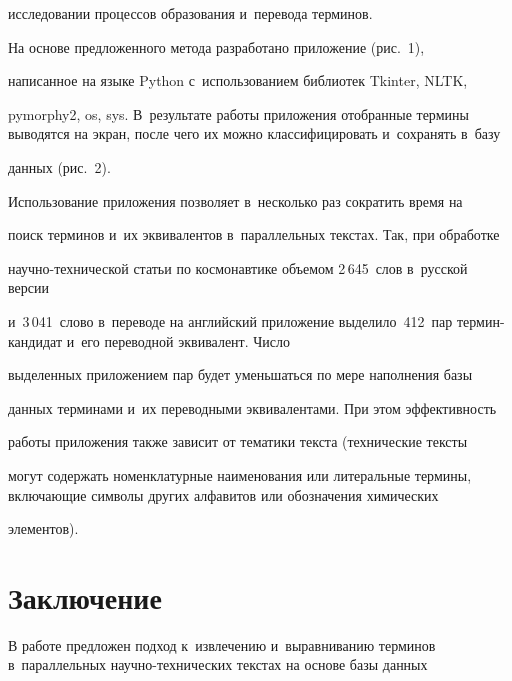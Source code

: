 исследовании процессов образования и~перевода терминов.


  


    На основе предложенного метода разработано приложение (рис.~1), 


написанное на языке Python с~использованием библиотек Tkinter, NLTK, 


pymorphy2, os, sys. В~результате работы приложения отобранные термины выводятся на экран, после чего их можно классифицировать и~сохранять в~базу 


данных (рис.~2).


    











  Использование приложения позволяет в~несколько раз сократить время на 


поиск терминов и~их эквивалентов в~параллельных текстах. Так, при обработке 


научно-технической статьи по космонавтике объемом 2\,645~слов в~русской версии


 и~3\,041~слово в~переводе на английский приложение выделило~412~пар тер\-мин-кан\-ди\-дат и~его переводной эквивалент. Число 


выделенных приложением пар будет уменьшаться по мере наполнения базы 


данных терминами и~их переводными эквивалентами. При этом эффективность 


работы приложения также зависит от тематики текста (технические тексты 


могут содержать номенклатурные наименования или литеральные термины, включающие символы других алфавитов или обозначения химических 


элементов).





\vspace*{-2pt}





\section{Заключение}





     В работе предложен подход к~извлечению и~выравниванию терминов в~параллельных на\-уч\-но-тех\-ни\-че\-ских текстах на основе базы данных 


